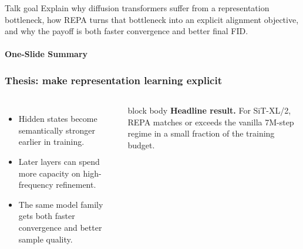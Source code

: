 \begin{frame}
  \titlepage
  \vspace{-0.2cm}
  \begin{block}{Talk goal}
    Explain why diffusion transformers suffer from a representation bottleneck,
    how REPA turns that bottleneck into an explicit alignment objective, and why the payoff is
    both faster convergence and better final FID.
  \end{block}
\end{frame}

\begin{frame}[t]
  \framesubtitle{One-Slide Summary}
  \frametitle{Thesis: make representation learning explicit}
  \begin{columns}[T,totalwidth=\textwidth]
    \vspace{0.18cm}
    \begin{itemize}
      \item Hidden states become semantically stronger earlier in training.
      \item Later layers can spend more capacity on high-frequency refinement.
      \item The same model family gets both faster convergence and better sample quality.
    \end{itemize}
    \vspace{0.1cm}
    \begin{beamercolorbox}[wd=\linewidth,rounded=true,sep=0.18cm]{block body}
      \textbf{Headline result.} For SiT-XL/2, REPA matches or exceeds the vanilla 7M-step regime
      in a small fraction of the training budget.
    \end{beamercolorbox}
    \FigOne[width=\linewidth]
  \end{columns}
\end{frame}


